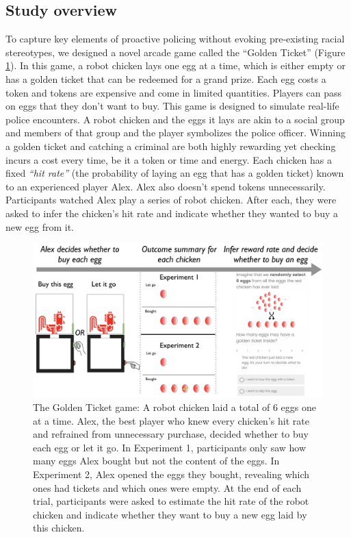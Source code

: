 \documentclass[10pt,letterpaper]{article}
\begin{document}
\subsection{Study overview}
To capture key elements of proactive policing without evoking pre-existing racial stereotypes, we designed a novel arcade game called the ``Golden Ticket'' (Figure \ref{fig:example}). In this game, a robot chicken lays one egg at a time, which is either empty or has a golden ticket that can be redeemed for a grand prize. Each egg costs a token and tokens are expensive and come in limited quantities. Players can pass on eggs that they don't want to buy. This game is designed to simulate real-life police encounters. A robot chicken and the eggs it lays are akin to a social group and members of that group and the player symbolizes the police officer. Winning a golden ticket and catching a criminal are both highly rewarding yet checking incurs a cost every time, be it a token or time and energy. Each chicken has a fixed \emph{``hit rate''} (the probability of laying an egg that has a golden ticket) known to an experienced player Alex. Alex also doesn't spend tokens unnecessarily. Participants watched Alex play a series of robot chicken. After each, they were asked to infer the chicken's hit rate and indicate whether they wanted to buy a new egg from it.

\begin{figure}[t]
  \includegraphics[width=\linewidth]{example.png}
  \caption{The Golden Ticket game: A robot chicken laid a total of 6 eggs one at a time. Alex, the best player who knew every chicken's hit rate and refrained from unnecessary purchase, decided whether to buy each egg or let it go. In Experiment 1, participants only saw how many eggs Alex bought but not the content of the eggs. In Experiment 2, Alex opened the eggs they bought, revealing which ones had tickets and which ones were empty. At the end of each trial, participants were asked to estimate the hit rate of the robot chicken and indicate whether they want to buy a new egg laid by this chicken.} 
  \label{fig:example}
\end{figure}
\end{document}
